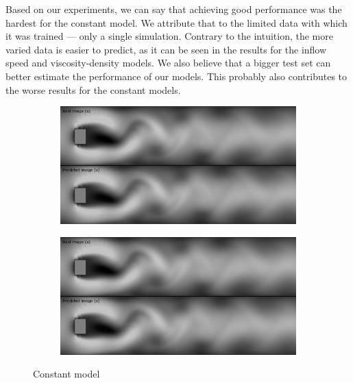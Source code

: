 \documentclass{llncs}
\begin{document}
Based on our experiments, we can say that achieving good performance was the hardest for the constant model. We attribute that to the limited data with which it was trained --- only a single simulation. Contrary to the intuition, the more varied data is easier to predict, as it can be seen in the results for the inflow speed and viscosity-density models. We also believe that a bigger test set can better estimate the performance of our models. This probably also contributes to the worse results for the constant models.

\begin{figure}  

  \begin{subfigure}{.5\textwidth}
    \centering
    \includegraphics[width=1\linewidth]{imgs/single_constant_x}

  \end{subfigure}  
  \begin{subfigure}{.5\textwidth}
    \centering
    \includegraphics[width=1\linewidth]{imgs/single_constant_y}  

  \end{subfigure}
  \begin{center}
    Constant model
  \end{center}
  

\end{figure}
\end{document}
